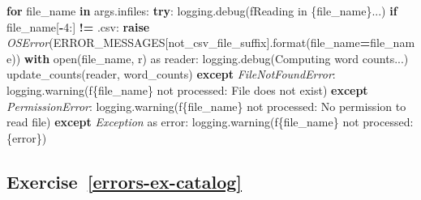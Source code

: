 \documentclass[
]{krantz}
\makeatletter
\newenvironment{Shaded}{\begin{snugshade}}{\end{snugshade}}
\newcommand{\BuiltInTok}[1]{#1}
\newcommand{\ControlFlowTok}[1]{\textcolor[rgb]{0.13,0.29,0.53}{\textbf{#1}}}
\newcommand{\DecValTok}[1]{\textcolor[rgb]{0.00,0.00,0.81}{#1}}
\newcommand{\ImportTok}[1]{#1}
\newcommand{\KeywordTok}[1]{\textcolor[rgb]{0.13,0.29,0.53}{\textbf{#1}}}
\newcommand{\NormalTok}[1]{#1}
\newcommand{\OperatorTok}[1]{\textcolor[rgb]{0.81,0.36,0.00}{\textbf{#1}}}
\newcommand{\PreprocessorTok}[1]{\textcolor[rgb]{0.56,0.35,0.01}{\textit{#1}}}
\newcommand{\SpecialCharTok}[1]{\textcolor[rgb]{0.00,0.00,0.00}{#1}}
\newcommand{\SpecialStringTok}[1]{\textcolor[rgb]{0.31,0.60,0.02}{#1}}
\newcommand{\StringTok}[1]{\textcolor[rgb]{0.31,0.60,0.02}{#1}}
\newenvironment{kframe}{%
\medskip{}
\setlength{\fboxsep}{.8em}
 \def\at@end@of@kframe{}%
 \ifinner\ifhmode%
  \def\at@end@of@kframe{\end{minipage}}%
  \begin{minipage}{\columnwidth}%
 \fi\fi%
 \def\FrameCommand##1{\hskip\@totalleftmargin \hskip-\fboxsep
 \colorbox{shadecolor}{##1}\hskip-\fboxsep
     \hskip-\linewidth \hskip-\@totalleftmargin \hskip\columnwidth}%
 \MakeFramed {\advance\hsize-\width
   \@totalleftmargin\z@ \linewidth\hsize
   \@setminipage}}%
 {\par\unskip\endMakeFramed%
 \at@end@of@kframe}
\renewenvironment{Shaded}{\begin{kframe}}{\end{kframe}}
\makeatother
\begin{document}
\begin{Shaded}
\begin{Highlighting}[]
\ControlFlowTok{for}\NormalTok{ file\_name }\KeywordTok{in}\NormalTok{ args.infiles:}
    \ControlFlowTok{try}\NormalTok{:}
\NormalTok{        logging.debug(}\SpecialStringTok{f\textquotesingle{}Reading in }\SpecialCharTok{\{}\NormalTok{file\_name}\SpecialCharTok{\}}\SpecialStringTok{...\textquotesingle{}}\NormalTok{)}
        \ControlFlowTok{if}\NormalTok{ file\_name[}\OperatorTok{{-}}\DecValTok{4}\NormalTok{:] }\OperatorTok{!=} \StringTok{\textquotesingle{}.csv\textquotesingle{}}\NormalTok{:}
            \ControlFlowTok{raise} \PreprocessorTok{OSError}\NormalTok{(ERROR\_MESSAGES[}\StringTok{\textquotesingle{}not\_csv\_file\_suffix\textquotesingle{}}\NormalTok{].}\BuiltInTok{format}\NormalTok{(file\_name}\OperatorTok{=}\NormalTok{file\_name))}
        \ControlFlowTok{with} \BuiltInTok{open}\NormalTok{(file\_name, }\StringTok{\textquotesingle{}r\textquotesingle{}}\NormalTok{) }\ImportTok{as}\NormalTok{ reader:}
\NormalTok{            logging.debug(}\StringTok{\textquotesingle{}Computing word counts...\textquotesingle{}}\NormalTok{)}
\NormalTok{            update\_counts(reader, word\_counts)}
    \ControlFlowTok{except} \PreprocessorTok{FileNotFoundError}\NormalTok{:}
\NormalTok{        logging.warning(}\SpecialStringTok{f\textquotesingle{}}\SpecialCharTok{\{}\NormalTok{file\_name}\SpecialCharTok{\}}\SpecialStringTok{ not processed: File does not exist\textquotesingle{}}\NormalTok{)}
    \ControlFlowTok{except} \PreprocessorTok{PermissionError}\NormalTok{:}
\NormalTok{        logging.warning(}\SpecialStringTok{f\textquotesingle{}}\SpecialCharTok{\{}\NormalTok{file\_name}\SpecialCharTok{\}}\SpecialStringTok{ not processed: No permission to read file\textquotesingle{}}\NormalTok{)}
    \ControlFlowTok{except} \PreprocessorTok{Exception} \ImportTok{as}\NormalTok{ error:}
\NormalTok{        logging.warning(}\SpecialStringTok{f\textquotesingle{}}\SpecialCharTok{\{}\NormalTok{file\_name}\SpecialCharTok{\}}\SpecialStringTok{ not processed: }\SpecialCharTok{\{}\NormalTok{error}\SpecialCharTok{\}}\SpecialStringTok{\textquotesingle{}}\NormalTok{)}
\end{Highlighting}
\end{Shaded}

\hypertarget{exercise-referrors-ex-catalog}{%
\subsection*{Exercise~\ref{errors-ex-catalog}}\label{exercise-referrors-ex-catalog}}
\end{document}
